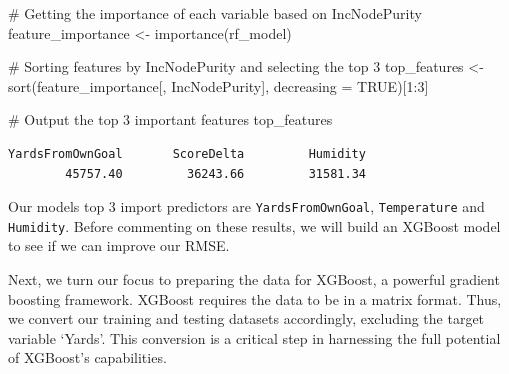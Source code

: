 \documentclass[
  super,
  preprint,
  3p]{elsarticle}
\newenvironment{Shaded}{\begin{snugshade}}{\end{snugshade}}
\newcommand{\AttributeTok}[1]{\textcolor[rgb]{0.40,0.45,0.13}{#1}}
\newcommand{\CommentTok}[1]{\textcolor[rgb]{0.37,0.37,0.37}{#1}}
\newcommand{\ConstantTok}[1]{\textcolor[rgb]{0.56,0.35,0.01}{#1}}
\newcommand{\DecValTok}[1]{\textcolor[rgb]{0.68,0.00,0.00}{#1}}
\newcommand{\FunctionTok}[1]{\textcolor[rgb]{0.28,0.35,0.67}{#1}}
\newcommand{\NormalTok}[1]{\textcolor[rgb]{0.00,0.23,0.31}{#1}}
\newcommand{\OtherTok}[1]{\textcolor[rgb]{0.00,0.23,0.31}{#1}}
\newcommand{\SpecialCharTok}[1]{\textcolor[rgb]{0.37,0.37,0.37}{#1}}
\newcommand{\StringTok}[1]{\textcolor[rgb]{0.13,0.47,0.30}{#1}}
\begin{document}
\begin{Shaded}
\begin{Highlighting}[]
\CommentTok{\# Getting the importance of each variable based on IncNodePurity}
\NormalTok{feature\_importance }\OtherTok{\textless{}{-}} \FunctionTok{importance}\NormalTok{(rf\_model)}

\CommentTok{\# Sorting features by IncNodePurity and selecting the top 3}
\NormalTok{top\_features }\OtherTok{\textless{}{-}} \FunctionTok{sort}\NormalTok{(feature\_importance[, }\StringTok{\textquotesingle{}IncNodePurity\textquotesingle{}}\NormalTok{], }\AttributeTok{decreasing =} \ConstantTok{TRUE}\NormalTok{)[}\DecValTok{1}\SpecialCharTok{:}\DecValTok{3}\NormalTok{]}

\CommentTok{\# Output the top 3 important features}
\NormalTok{top\_features}
\end{Highlighting}
\end{Shaded}

\begin{verbatim}
YardsFromOwnGoal       ScoreDelta         Humidity 
        45757.40         36243.66         31581.34 
\end{verbatim}

Our models top 3 import predictors are \texttt{YardsFromOwnGoal},
\texttt{Temperature} and \texttt{Humidity}. Before commenting on these
results, we will build an XGBoost model to see if we can improve our
RMSE.

Next, we turn our focus to preparing the data for XGBoost, a powerful
gradient boosting framework. XGBoost requires the data to be in a matrix
format. Thus, we convert our training and testing datasets accordingly,
excluding the target variable `Yards'. This conversion is a critical
step in harnessing the full potential of XGBoost's capabilities.

\begin{Shaded}
\end{Shaded}
\end{document}
